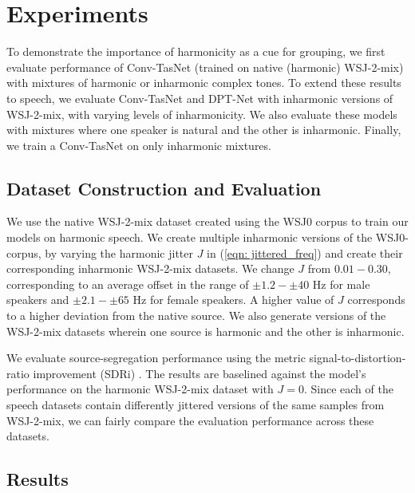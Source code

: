 \documentclass{article}
\begin{document}
\section{Experiments}
\label{sec:Experiments}
To demonstrate the importance of harmonicity as a cue for grouping, we first evaluate performance of Conv-TasNet (trained on native (harmonic) WSJ-2-mix) with mixtures of harmonic or inharmonic complex tones. To extend these results to speech, we evaluate Conv-TasNet and DPT-Net with inharmonic versions of WSJ-2-mix, with varying levels of inharmonicity. We also evaluate these models with mixtures where one speaker is natural and the other is inharmonic. Finally, we train a Conv-TasNet on only inharmonic mixtures.

\subsection{Dataset Construction and Evaluation} \label{sec:Datasets}
We use the native WSJ-2-mix dataset \cite{hershey2016deep} created using the WSJ0 corpus to train our models on harmonic speech. We create multiple inharmonic versions of the WSJ0-corpus, by varying the harmonic jitter $J$ in (\ref{eqn: jittered_freq}) and create their corresponding inharmonic WSJ-2-mix datasets. We change $J$ from $0.01-0.30$, corresponding to an average offset in the range of $\pm1.2-\pm40$ Hz for male speakers and $\pm2.1-\pm65$ Hz for female speakers. A higher value of $J$ corresponds to a higher deviation from the native source. We also generate versions of the WSJ-2-mix datasets wherein one source is harmonic and the other is inharmonic. 

We evaluate source-segregation performance using the metric signal-to-distortion-ratio improvement (SDRi) \cite{vincent2006performance}. The results are baselined against the model's performance on the harmonic WSJ-2-mix dataset with $J=0$. Since each of the speech datasets contain differently jittered versions of the same samples from WSJ-2-mix, we can fairly compare the evaluation performance across these datasets.






\subsection{Results} \label{sec:Results}
\end{document}
